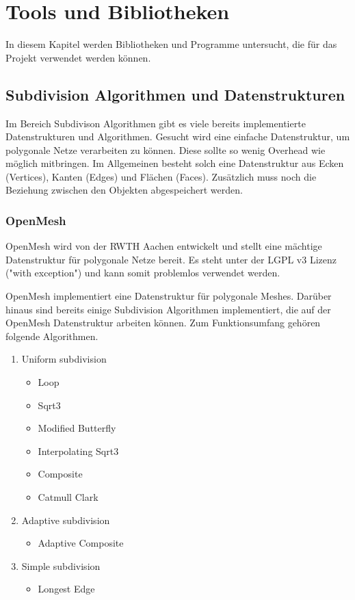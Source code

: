 \chapter{Tools und Bibliotheken}

In diesem Kapitel werden Bibliotheken und Programme untersucht, die für das Projekt verwendet werden können. 
 
\section{Subdivision Algorithmen und Datenstrukturen}

Im Bereich Subdivison Algorithmen gibt es viele bereits implementierte Datenstrukturen und Algorithmen.
Gesucht wird eine einfache Datenstruktur, um polygonale Netze verarbeiten zu können.
Diese sollte so wenig Overhead wie möglich mitbringen.
Im Allgemeinen besteht solch eine Datenstruktur aus Ecken (Vertices), Kanten (Edges) und Flächen (Faces).
Zusätzlich muss noch die Beziehung zwischen den Objekten abgespeichert werden.

\subsection{OpenMesh}

OpenMesh wird von der \acs{RWTH} Aachen entwickelt und stellt eine mächtige Datenstruktur für polygonale Netze bereit.
Es steht unter der \acs{LGPL} v3 Lizenz ("with exception") und kann somit problemlos verwendet werden.

OpenMesh implementiert eine Datenstruktur für polygonale Meshes.
Darüber hinaus sind bereits einige Subdivision Algorithmen implementiert, die auf der OpenMesh Datenstruktur arbeiten können.
Zum Funktionsumfang gehören folgende Algorithmen.
\begin{enumerate}
\item Uniform subdivision
\begin{itemize}
	\item Loop
	\item Sqrt3
	\item Modified Butterfly
	\item Interpolating Sqrt3
	\item Composite
	\item Catmull Clark
\end{itemize}
\item Adaptive subdivision
\begin{itemize}
	\item Adaptive Composite
\end{itemize}
\item Simple subdivision
\begin{itemize}
	\item Longest Edge
\end{itemize}
\end{enumerate}

